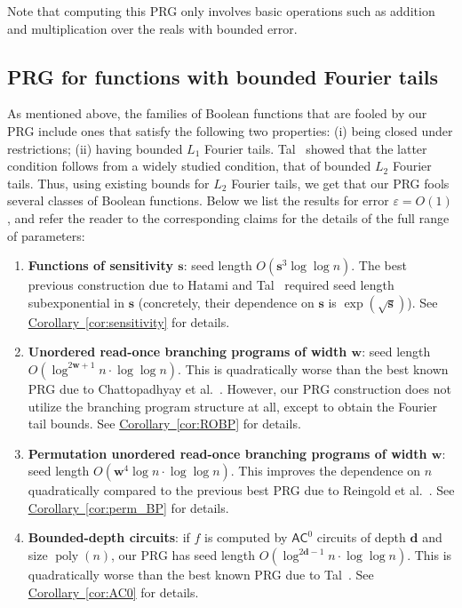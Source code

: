 \documentclass[11pt]{article}
\numberwithin{equation}{section}
\theoremstyle{definition}
\theoremstyle{plain}
\newcommand{\cclass}[1]{\textsf{#1}}
\newcommand{\expref}[2]{\hyperref[#2]{#1~\ref{#2}}}
\newcommand{\eps}{\varepsilon}
\DeclareMathOperator{\poly}{poly}      %
\begin{document}
Note that computing this PRG only involves basic operations such as addition and multiplication over the reals with bounded error. 
\subsection{PRG for functions with bounded Fourier tails}
As mentioned above, the families of Boolean functions that are fooled by our PRG include ones that satisfy the following two properties: (i) being closed under restrictions; (ii) having bounded $L_1$
Fourier tails. Tal~\cite{tal2017tight} showed that the latter condition follows from a widely studied condition, that of bounded $L_2$ Fourier tails.
Thus, using existing bounds for $L_2$ Fourier tails, we get that our PRG fools several classes of Boolean functions.
Below we list the results for error $\eps=O(1)$, and refer the reader to the corresponding claims for the details of the full range of parameters:

\begin{enumerate}
%
%


\item {\bf Functions of sensitivity $\mathbf{s}$}: seed length $O(\mathbf{s}^3 \log \log n)$. The best previous construction due to Hatami and Tal~\cite{hatami2017pseudorandom} required seed length subexponential in $\mathbf{s}$ (concretely, their dependence on
   $\mathbf{s}$
  is $\exp(\sqrt{\mathbf{s}})$). See \expref{Corollary}{cor:sensitivity} for details.

%
%

\item {\bf Unordered read-once branching programs of width $\mathbf{w}$}: seed length $O(\log^{2\mathbf{w}+1} n \cdot \log\log n)$. This is quadratically worse than the best known PRG due to Chattopadhyay et al.~\cite{chattopadhyay2018improved}. However, our PRG construction does not utilize the branching program structure at all, except to obtain the Fourier tail bounds. See \expref{Corollary}{cor:ROBP} for details.

%
%

\item {\bf Permutation unordered read-once branching programs of width $\mathbf{w}$}: seed length $O(\mathbf{w}^4 \log n  \cdot \log\log n)$. This improves the dependence on $n$ quadratically compared to the previous best PRG due to Reingold et al.~\cite{reingold2013pseudorandomness}. See \expref{Corollary}{cor:perm_BP} for details.
	
%
\item {\bf Bounded-depth circuits}:  %
if $f$ is computed by $\cclass{AC}^0$ circuits of depth $\mathbf{d}$ and size $\poly(n)$, our PRG has seed length
%
%
	$O(\log^{2\mathbf{d}-1} n \cdot \log\log n )$. This is quadratically worse than the best known PRG due to Tal~\cite{tal2017tight}.
See \expref{Corollary}{cor:AC0} for details.
\end{enumerate}
\end{document}
